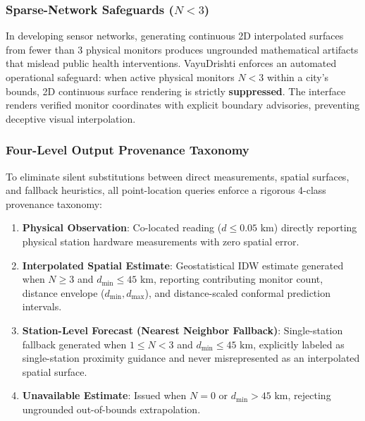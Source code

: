 \documentclass[conference]{IEEEtran}
\begin{document}
\subsubsection{Sparse-Network Safeguards ($N < 3$)}
In developing sensor networks, generating continuous 2D interpolated surfaces from fewer than 3 physical monitors produces ungrounded mathematical artifacts that mislead public health interventions. VayuDrishti enforces an automated operational safeguard: when active physical monitors $N < 3$ within a city's bounds, 2D continuous surface rendering is strictly \textbf{suppressed}. The interface renders verified monitor coordinates with explicit boundary advisories, preventing deceptive visual interpolation.

\subsubsection{Four-Level Output Provenance Taxonomy}
To eliminate silent substitutions between direct measurements, spatial surfaces, and fallback heuristics, all point-location queries enforce a rigorous 4-class provenance taxonomy:
\begin{enumerate}
    \item \textbf{Physical Observation}: Co-located reading ($d \le 0.05\text{ km}$) directly reporting physical station hardware measurements with zero spatial error.
    \item \textbf{Interpolated Spatial Estimate}: Geostatistical IDW estimate generated when $N \ge 3$ and $d_{\text{min}} \le 45\text{ km}$, reporting contributing monitor count, distance envelope ($d_{\text{min}}, d_{\text{max}}$), and distance-scaled conformal prediction intervals.
    \item \textbf{Station-Level Forecast (Nearest Neighbor Fallback)}: Single-station fallback generated when $1 \le N < 3$ and $d_{\text{min}} \le 45\text{ km}$, explicitly labeled as single-station proximity guidance and never misrepresented as an interpolated spatial surface.
    \item \textbf{Unavailable Estimate}: Issued when $N = 0$ or $d_{\text{min}} > 45\text{ km}$, rejecting ungrounded out-of-bounds extrapolation.
\end{enumerate}
\end{document}

